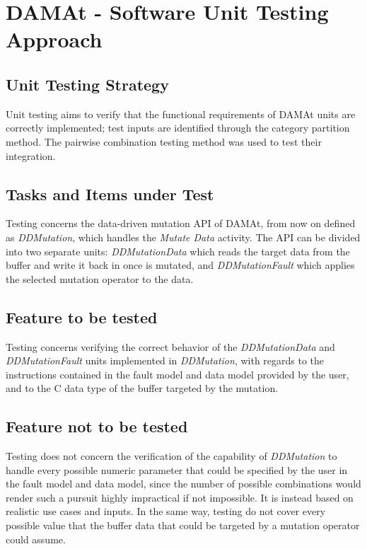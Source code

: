 
\chapter{DAMAt - Software Unit Testing Approach}
\label{chap:approach_DAMAt}


\section{Unit Testing Strategy}

Unit testing aims to verify that the functional requirements of DAMAt units are correctly implemented; test inputs are identified through the category partition method.
The pairwise combination testing method was used to test their integration.


\section{Tasks and Items under Test}

Testing concerns the data-driven mutation API of DAMAt, from now on defined as \emph{DDMutation}, which handles the \emph{Mutate Data} activity.
The API can be divided into two separate units: \emph{DDMutationData} which reads the target data from the buffer and write it back in once is mutated, and \emph{DDMutationFault} which applies the selected mutation operator to the data.

\section{Feature to be tested}

Testing concerns verifying the correct behavior of the \emph{DDMutationData} and \emph{DDMutationFault} units implemented in \emph{DDMutation}, with regards to the instructions contained in the fault model and data model provided by the user, and to the C data type of the buffer targeted by the mutation.

\section{Feature not to be tested}

Testing does not concern the verification of the capability of \emph{DDMutation} to handle every possible numeric parameter that could be specified by the user in the fault model and data model, since the number of possible combinations would render such a pursuit highly impractical if not impossible.
It is instead based on realistic use cases and inputs.
In the same way, testing do not cover every possible value that the buffer data that could be targeted by a mutation operator could assume.


